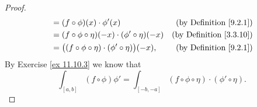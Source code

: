 \begin{proof}
\begin{align*}
                               & = (f \circ \phi)(x) \cdot \phi'(x)                                  & \text{(by Definition \ref{9.2.1})}  \\
                               & = (f \circ \phi \circ \eta)(-x) \cdot (\phi' \circ \eta)(-x)        & \text{(by Definition \ref{3.3.10})} \\
                               & = \big((f \circ \phi \circ \eta) \cdot (\phi' \circ \eta)\big)(-x), & \text{(by Definition \ref{9.2.1})}
    \end{align*}
    By Exercise \ref{ex 11.10.3} we know that
    \[
        \int_{[a, b]} (f \circ \phi) \phi' = \int_{[-b, -a]} (f \circ \phi \circ \eta) \cdot (\phi' \circ \eta).
    \]
\end{proof}